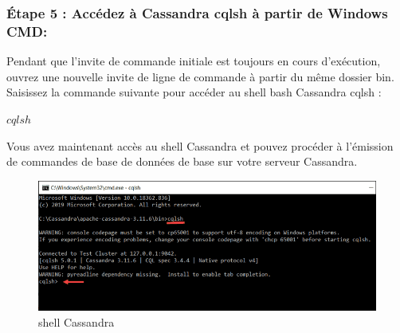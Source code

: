 \subsubsection {Étape 5 : Accédez à Cassandra cqlsh à partir de Windows CMD:}

Pendant que l'invite de commande initiale est toujours en cours d'exécution, ouvrez une nouvelle invite de ligne de commande à partir du même dossier bin. Saisissez la commande suivante pour accéder au shell bash Cassandra cqlsh :

\begin{center}
$cqlsh$
\end{center}
Vous avez maintenant accès au shell Cassandra et pouvez procéder à l'émission de commandes de base de données de base sur votre serveur Cassandra.

\begin{figure}[h]
	\centering
    \includegraphics[scale=0.6]{img/part3/2.7}
    \caption{shell Cassandra}
\end{figure}